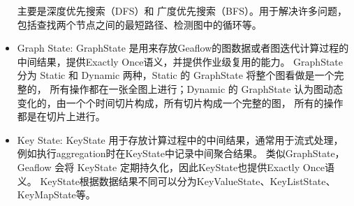 \begin{itemize}
    主要是深度优先搜索（DFS）和 广度优先搜索（BFS）。用于解决许多问题，包括查找两个节点之间的最短路径、检测图中的循环等。
  \item Graph State:  GraphState 是用来存放Geaflow的图数据或者图迭代计算过程的中间结果，提供Exactly Once语义，并提供作业级复用的能力。
    GraphState 分为 Static 和 Dynamic 两种，Static 的 GraphState 将整个图看做是一个完整的，
    所有操作都在一张全图上进行；Dynamic 的 GraphState 认为图动态变化的，由一个个时间切片构成，所有切片构成一个完整的图，
    所有的操作都是在切片上进行。
  \item Key State:  KeyState 用于存放计算过程中的中间结果，通常用于流式处理，例如执行aggregation时在KeyState中记录中间聚合结果。
    类似GraphState，Geaflow 会将 KeyState 定期持久化，因此KeyState也提供Exactly Once语义。
    KeyState根据数据结果不同可以分为KeyValueState、KeyListState、KeyMapState等。
\end{itemize}

